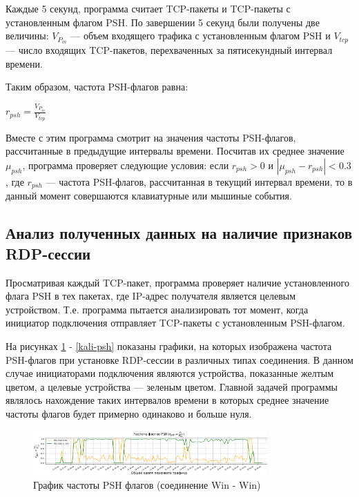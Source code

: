 \documentclass[bachelor, och, coursework]{SCWorks}
\begin{document}
Каждые 5 секунд, программа считает TCP-пакеты и TCP-пакеты с установленным флагом PSH. По завершении
5 секунд были получены две величины: $V_{P_{in}}$ --- объем входящего трафика с установленным флагом PSH и $V_{tcp}$ --- число входящих
TCP-пакетов, перехваченных за пятисекундный интервал времени.


Таким образом, частота PSH-флагов равна:
\begin{center}
  $r_{psh} = \frac{V_{P_{in}}}{V_{tcp}}$
\end{center} 

Вместе с этим программа смотрит на значения частоты PSH-флагов, рассчитанные в предыдущие интервалы времени. Посчитав их среднее значение $\mu_{psh}$,
программа проверяет следующие условия: если $r_{psh} > 0$ и $|\mu_{psh} - r_{psh}| < 0.3$, где $r_{psh}$ --- частота PSH-флагов, рассчитанная в текущий
интервал времени, то в данный момент совершаются клавиатурные или мышиные события.


\subsection{Анализ полученных данных на наличие признаков RDP-сессии}

Просматривая каждый TCP-пакет, программа проверяет наличие установленного флага PSH в тех пакетах, где IP-адрес 
получателя является целевым устройством. Т.е. программа пытается анализировать тот момент, когда инициатор подключения
отправляет TCP-пакеты с установленным PSH-флагом.


На рисунках \ref{win-psh} - \ref{kali-psh} показаны графики, на которых изображена частота PSH-флагов при установке RDP-сессии 
в различных типах соединения. В данном случае инициаторами подключения являются устройства, показанные желтым цветом, а целевые устройства --- 
зеленым цветом. Главной задачей программы являлось нахождение таких интервалов времени в которых среднее значение частоты флагов будет примерно
одинаково и больше нуля.

\begin{figure}[H]
  \centering
  \includegraphics[width=0.8\textwidth]{photo/psh-win.png}
  \caption{График частоты PSH флагов (соединение Win - Win)}
  \label{win-psh}
\end{figure}
\end{document}
